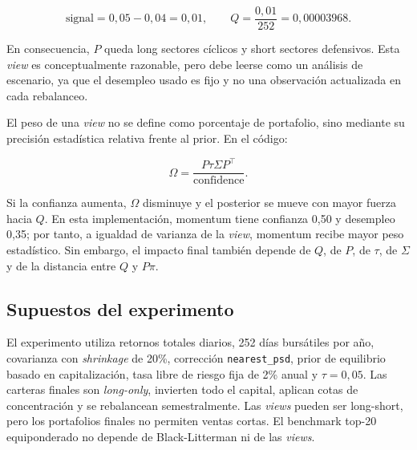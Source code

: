 \begin{equation}
\text{signal} = 0,05 - 0,04 = 0,01,
\qquad
Q = \frac{0,01}{252} = 0,00003968.
\end{equation}

En consecuencia, $P$ queda long sectores c\'iclicos y short sectores defensivos.
Esta \textit{view} es conceptualmente razonable, pero debe leerse como un
an\'alisis de escenario, ya que el desempleo usado es fijo y no una observaci\'on
actualizada en cada rebalanceo.

El peso de una \textit{view} no se define como porcentaje de portafolio, sino
mediante su precisi\'on estad\'istica relativa frente al prior. En el c\'odigo:

\begin{equation}
\Omega = \frac{P\tau\Sigma P^\top}{\text{confidence}}.
\end{equation}

Si la confianza aumenta, $\Omega$ disminuye y el posterior se mueve con mayor
fuerza hacia $Q$. En esta implementaci\'on, momentum tiene confianza 0,50 y
desempleo 0,35; por tanto, a igualdad de varianza de la \textit{view}, momentum
recibe mayor peso estad\'istico. Sin embargo, el impacto final tambi\'en depende
de $Q$, de $P$, de $\tau$, de $\Sigma$ y de la distancia entre $Q$ y $P\pi$.

\subsection*{Supuestos del experimento}

El experimento utiliza retornos totales diarios, 252 d\'ias burs\'atiles por
a\~no, covarianza con \textit{shrinkage} de 20\%, correcci\'on
\texttt{nearest\_psd}, prior de equilibrio basado en capitalizaci\'on, tasa libre
de riesgo fija de 2\% anual y $\tau = 0,05$. Las carteras finales son
\textit{long-only}, invierten todo el capital, aplican cotas de concentraci\'on y
se rebalancean semestralmente. Las \textit{views} pueden ser long-short, pero
los portafolios finales no permiten ventas cortas. El benchmark top-20
equiponderado no depende de Black-Litterman ni de las \textit{views}.

